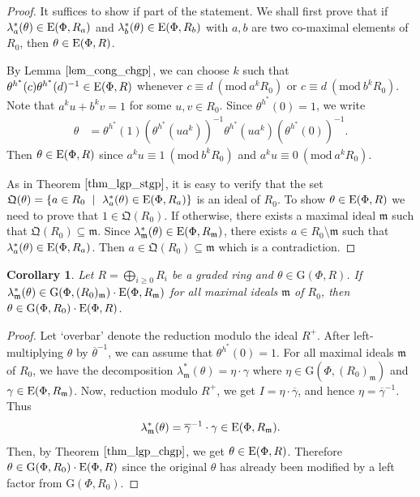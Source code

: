 \documentclass[11pt]{amsart}
\newtheorem{cor}[thm]{Corollary}
\theoremstyle{definition}
\numberwithin{equation}{section}
\numberwithin{equation}{section}
\newcommand{\G}{\mathrm{G}}
\newcommand{\<}{\langle}
\renewcommand{\>}{\rangle}
\newcommand{\El}{{\operatorname{\rm E}}}
\begin{document}
\begin{proof}
It suffices to show if part of the statement. We shall first prove that if $\lambda^{\ast}_{a}(\theta)\in\El(\Phi,R_{a})$ and $\lambda^{\ast}_{b}(\theta)\in\El(\Phi,R_{b})$ with $a,b$ are two co-maximal elements of $R_{0}$, then $\theta\in\El(\Phi,R)$.\par
By Lemma $\ref{lem_cong_chgp}$, we can choose $k$ such that $\theta^{h^{\ast}}(c)\theta^{h^{\ast}}(d)^{-1}\in\El(\Phi,R)$ whenever $c\equiv d~(\text{mod} ~a^{k}R_{0})$ or $c\equiv d~(\text{mod} ~b^{k}R_{0})$. Note that $a^{k}u+b^{k}v=1$ for some $u,v\in R_{0}$. Since $\theta^{h^{\ast}}(0)=1$, we write 
\[\begin{split}
        \theta &=\theta^{h^{\ast}}(1)(\theta^{h^{\ast}}(ua^{k}))^{-1}\theta^{h^{\ast}}(ua^{k})(\theta^{h^{\ast}}(0))^{-1}.
    \end{split}\]
 Then $\theta\in\El(\Phi,R)$ since $a^{k}u\equiv 1 ~(\text{mod} ~b^{k}R_{0})$ and $a^{k}u\equiv 0~(\text{mod} ~a^{k}R_{0})$.\par
As in Theorem $\ref{thm_lgp_stgp}$, it is easy to verify that the set $\mathfrak{Q}(\theta)=\{a\in R_{0}~\mid~\lambda^{\ast}_{a}(\theta)\in\El(\Phi,R_{a})\}$ is an ideal of $R_{0}$. To show $\theta\in \El(\Phi,R)$ we need to prove that $1\in \mathfrak{Q}(R_{0})$. If otherwise, there exists a maximal ideal $\mathfrak{m}$ such that $\mathfrak{Q}(R_{0})\subseteq \mathfrak{m}$. Since $\lambda^{\ast}_{\mathfrak{m}}(\theta)\in \El(\Phi,R_{\mathfrak{m}})$, there exists $a\in R_{0}\setminus\mathfrak{m}$ such that $\lambda^{\ast}_{a}(\theta)\in\El(\Phi,R_{a})$. Then $a\in\mathfrak{Q}(R_{0})\subseteq \mathfrak{m}$ which is a contradiction.
\end{proof}
\begin{cor}
  Let $R=\bigoplus_{i\geq 0}R_{i}$ be a graded ring and $\theta\in \G(\Phi,R)$. If $\lambda^{\ast}_{\mathfrak{m}}(\theta)\in \G(\Phi,(R_{0})_{\mathfrak{m}})\cdot\El(\Phi,R_{\mathfrak{m}})$ for all maximal ideals $\mathfrak{m}$ of $R_{0}$, then $\theta\in \G(\Phi,R_{0})\cdot\El(\Phi,R)$.
\end{cor}
\begin{proof}
   Let `overbar' denote the reduction modulo the ideal $R^{+}$. After left-multiplying $\theta$ by $\overline{\theta}^{-1}$, we can assume that $\theta^{h^{\ast}}(0)=1$. For all maximal ideals $\mathfrak{m}$ of $R_{0}$, we have the decomposition $\lambda^{\ast}_{\mathfrak{m}}(\theta)=\eta\cdot \gamma$ where $\eta\in \G(\Phi,(R_{0})_{\mathfrak{m}})$ and $\gamma\in \El(\Phi,R_{\mathfrak{m}})$. Now, reduction modulo $R^{+}$, we get $I=\eta\cdot\overline{\gamma}$, and hence $\eta=\overline{\gamma}^{-1}$. Thus $$\lambda^{\ast}_{\mathfrak{m}}(\theta)=\overline{\gamma}^{-1}\cdot\gamma\in\El(\Phi,R_{\mathfrak{m}}).$$ Then, by Theorem $\ref{thm_lgp_chgp}$, we get $\theta\in\El(\Phi,R)$. Therefore $\theta\in \G(\Phi,R_{0})\cdot\El(\Phi,R)$ since the original $\theta$ has already been modified by a left factor from $\G(\Phi,R_{0})$. %
\end{proof}
 
\end{document}
